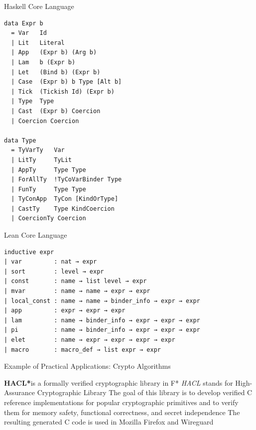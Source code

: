 \documentclass[pdf]{beamer}
\begin{document}
\begin{frame}[fragile]{Haskell Core Language}
  \begin{verbatim}
data Expr b
  = Var   Id
  | Lit   Literal
  | App   (Expr b) (Arg b)
  | Lam   b (Expr b)
  | Let   (Bind b) (Expr b)
  | Case  (Expr b) b Type [Alt b]
  | Tick  (Tickish Id) (Expr b)
  | Type  Type
  | Cast  (Expr b) Coercion
  | Coercion Coercion

data Type
  = TyVarTy   Var
  | LitTy     TyLit
  | AppTy     Type Type
  | ForAllTy  !TyCoVarBinder Type
  | FunTy     Type Type
  | TyConApp  TyCon [KindOrType]
  | CastTy    Type KindCoercion
  | CoercionTy Coercion
  \end{verbatim}
\end{frame}

\begin{frame}[fragile]{Lean Core Language}
  \begin{verbatim}
inductive expr
| var         : nat → expr
| sort        : level → expr
| const       : name → list level → expr
| mvar        : name → name → expr → expr
| local_const : name → name → binder_info → expr → expr
| app         : expr → expr → expr
| lam         : name → binder_info → expr → expr → expr
| pi          : name → binder_info → expr → expr → expr
| elet        : name → expr → expr → expr → expr
| macro       : macro_def → list expr → expr
  \end{verbatim}
\end{frame}

\begin{frame}{Example of Practical Applications: Crypto Algorithms}
  \begin{outline}
    \1 \textbf{HACL*}\footnotemark[5] is a formally verified cryptographic library in F*
    \1 {\em HACL} stands for High-Assurance Cryptographic Library
    \1 The goal of this library is to develop verified C reference implementations for popular cryptographic primitives and to verify them for memory safety, functional correctness, and secret independence
    \1 The resulting generated C code is used in Mozilla Firefox and Wireguard
  \end{outline}
\end{frame}
\end{document}
